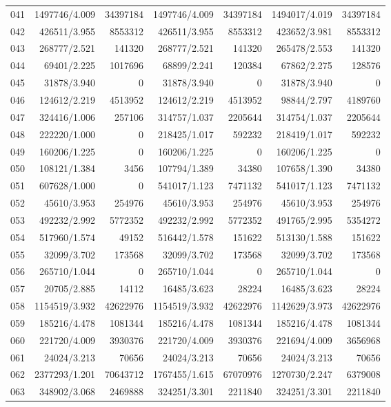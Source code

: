 \begin{longtable}{crrrrrr}
041 & 1497746/4.009 & 34397184 & 1497746/4.009 & 34397184 & 1494017/4.019 & 34397184 \\
042 & 426511/3.955 & 8553312 & 426511/3.955 & 8553312 & 423652/3.981 & 8553312 \\
043 & 268777/2.521 & 141320 & 268777/2.521 & 141320 & 265478/2.553 & 141320 \\
044 & 69401/2.225 & 1017696 & 68899/2.241 & 120384 & 67862/2.275 & 128576 \\
045 & 31878/3.940 & 0 & 31878/3.940 & 0 & 31878/3.940 & 0 \\
046 & 124612/2.219 & 4513952 & 124612/2.219 & 4513952 & 98844/2.797 & 4189760 \\
047 & 324416/1.006 & 257106 & 314757/1.037 & 2205644 & 314754/1.037 & 2205644 \\
048 & 222220/1.000 & 0 & 218425/1.017 & 592232 & 218419/1.017 & 592232 \\
049 & 160206/1.225 & 0 & 160206/1.225 & 0 & 160206/1.225 & 0 \\
050 & 108121/1.384 & 3456 & 107794/1.389 & 34380 & 107658/1.390 & 34380 \\
051 & 607628/1.000 & 0 & 541017/1.123 & 7471132 & 541017/1.123 & 7471132 \\
052 & 45610/3.953 & 254976 & 45610/3.953 & 254976 & 45610/3.953 & 254976 \\
053 & 492232/2.992 & 5772352 & 492232/2.992 & 5772352 & 491765/2.995 & 5354272 \\
054 & 517960/1.574 & 49152 & 516442/1.578 & 151622 & 513130/1.588 & 151622 \\
055 & 32099/3.702 & 173568 & 32099/3.702 & 173568 & 32099/3.702 & 173568 \\
056 & 265710/1.044 & 0 & 265710/1.044 & 0 & 265710/1.044 & 0 \\
057 & 20705/2.885 & 14112 & 16485/3.623 & 28224 & 16485/3.623 & 28224 \\
058 & 1154519/3.932 & 42622976 & 1154519/3.932 & 42622976 & 1142629/3.973 & 42622976 \\
059 & 185216/4.478 & 1081344 & 185216/4.478 & 1081344 & 185216/4.478 & 1081344 \\
060 & 221720/4.009 & 3930376 & 221720/4.009 & 3930376 & 221694/4.009 & 3656968 \\
061 & 24024/3.213 & 70656 & 24024/3.213 & 70656 & 24024/3.213 & 70656 \\
062 & 2377293/1.201 & 70643712 & 1767455/1.615 & 67070976 & 1270730/2.247 & 6379008 \\
063 & 348902/3.068 & 2469888 & 324251/3.301 & 2211840 & 324251/3.301 & 2211840 \\

\end{longtable}
